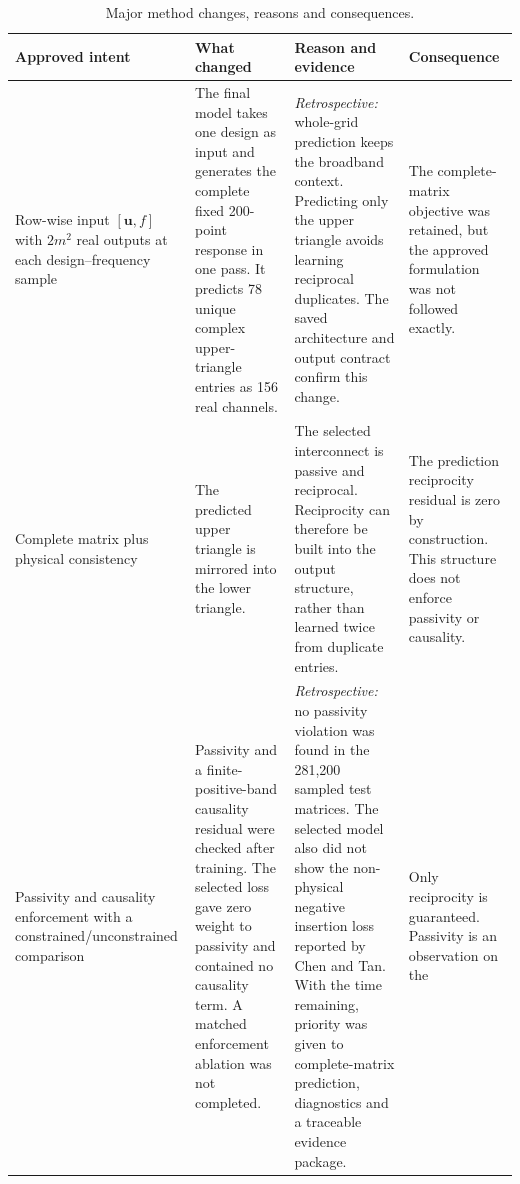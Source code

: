 \begin{table}[!htbp]
    \caption{Major method changes, reasons and consequences.}
    \label{tab:appendix-c-changes}
    \centering
    \scriptsize
    \begin{tabular}{@{}p{}p{}
                         p{}p{}@{}}
        \toprule
        Approved intent & What changed & Reason and evidence
                        & Consequence \\
        \midrule
        Row-wise input $[\mathbf u,f]$ with $2m^2$ real outputs at each
        design--frequency sample
          & The final model takes one design as input and generates the complete
            fixed 200-point response in one pass. It predicts 78 unique complex
            upper-triangle entries as 156 real channels.
          & \emph{Retrospective:} whole-grid prediction keeps the broadband
            context. Predicting only the upper triangle avoids learning
            reciprocal duplicates. The saved architecture and output contract
            confirm this change.
          & The complete-matrix objective was retained, but the approved
            formulation was not followed exactly. \\
        Complete matrix plus physical consistency
          & The predicted upper triangle is mirrored into the lower triangle.
          & The selected interconnect is passive and reciprocal. Reciprocity
            can therefore be built into the output structure, rather than
            learned twice from duplicate entries.
          & The prediction reciprocity residual is zero by construction. This
            structure does not enforce passivity or causality. \\
        Passivity and causality enforcement with a constrained/unconstrained
        comparison
          & Passivity and a finite-positive-band causality residual were checked
            after training. The selected loss gave zero weight to passivity and
            contained no causality term. A matched enforcement ablation was not
            completed.
          & \emph{Retrospective:} no passivity violation was found in the
            281,200 sampled test matrices. The selected model also did not show
            the non-physical negative insertion loss reported by Chen and Tan.
            With the time remaining, priority was given to complete-matrix
            prediction, diagnostics and a traceable evidence package.
          & Only reciprocity is guaranteed. Passivity is an observation on the

\end{tabular}
\end{table}
